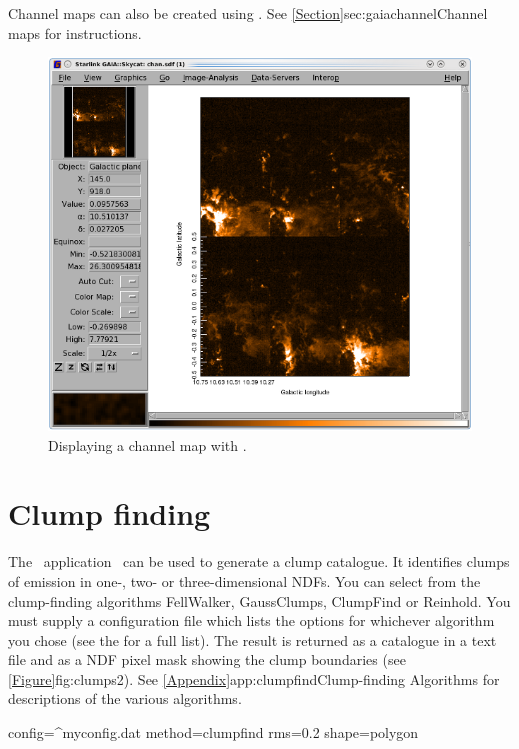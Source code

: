 \documentclass[11pt,oneside,chapters]{starlink}
\begin{document}
Channel maps can also be created using \gaia. See
\cref{Section}{sec:gaiachannel}{Channel maps} for instructions.


\begin{figure}[h!]
\begin{center}
\includegraphics[width=0.8\linewidth]{sc20_chanmap}
\caption[Displaying a channel map with \gaia.]{\label{fig:chanmap}
  Displaying a channel map with \gaia.}
\end{center}
\end{figure}

\section{Clump finding}
\label{sec:clumpfind}

The \cupid\ application \findclumps\ can be used to generate a clump
catalogue. It identifies clumps of emission in one-, two- or
three-dimensional NDFs. You can select from the clump-finding
algorithms FellWalker, GaussClumps, ClumpFind or Reinhold. You must
supply a configuration file which lists the options for whichever
algorithm you chose (see the 
for a full list). The result is returned as a catalogue in a text file
and as a NDF pixel mask showing the clump boundaries (see
\cref{Figure}{fig:clumps2}{}). See
\cref{Appendix}{app:clumpfind}{Clump-finding Algorithms} for
descriptions of the various algorithms.

\begin{terminalv}
  config=^myconfig.dat method=clumpfind rms=0.2 shape=polygon
\end{terminalv}
\end{document}
